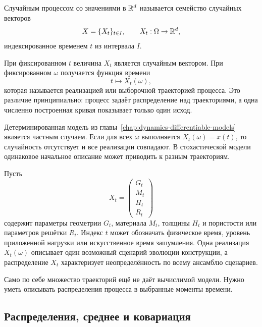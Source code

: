 \begin{definition}
Случайным процессом со значениями в $\mathbb{R}^d$ называется семейство случайных векторов
\begin{equation}
\label{eq:stochastic-process-definition-v01}
X=\{X_t\}_{t\in I},
\qquad
X_t:\Omega\to\mathbb{R}^d,
\end{equation}
индексированное временем $t$ из интервала $I$.
\end{definition}

При фиксированном $t$ величина $X_t$ является случайным вектором. При фиксированном $\omega$ получается функция времени
\begin{equation}
\label{eq:sample-path-v01}
t\longmapsto X_t(\omega),
\end{equation}
которая называется реализацией или выборочной траекторией процесса. Это различие принципиально: процесс задаёт распределение над траекториями, а одна численно построенная кривая показывает только один исход.

Детерминированная модель из главы~\ref{chap:dynamics-differentiable-models} является частным случаем. Если для всех $\omega$ выполняется $X_t(\omega)=x(t)$, то случайность отсутствует и все реализации совпадают. В стохастической модели одинаковое начальное описание может приводить к разным траекториям.

\begin{application}
Пусть
\begin{equation}
\label{eq:stochastic-design-state-v01}
X_t=
\begin{pmatrix}
G_t\\
M_t\\
H_t\\
R_t
\end{pmatrix}
\end{equation}
содержит параметры геометрии $G_t$, материала $M_t$, толщины $H_t$ и пористости или параметров решётки $R_t$. Индекс $t$ может обозначать физическое время, уровень приложенной нагрузки или искусственное время зашумления. Одна реализация $X_t(\omega)$ описывает один возможный сценарий эволюции конструкции, а распределение $X_t$ характеризует неопределённость по всему ансамблю сценариев.
\end{application}

Само по себе множество траекторий ещё не даёт вычислимой модели. Нужно уметь описывать распределения процесса в выбранные моменты времени.

\subsection{Распределения, среднее и ковариация}

